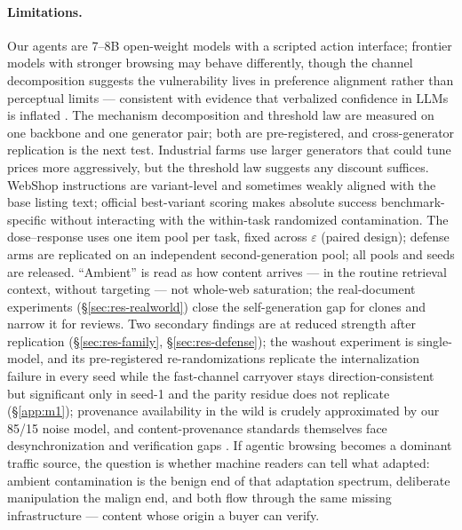 \paragraph{Limitations.}
Our agents are 7--8B open-weight models with a scripted action interface;
frontier models with stronger browsing may behave differently, though
the channel decomposition suggests the vulnerability lives in preference
alignment rather than perceptual limits --- consistent with evidence that
verbalized confidence in LLMs is inflated \cite{zhao2026wired,wang2025calibrating}. The
mechanism decomposition and threshold law are measured on one backbone
and one generator pair; both are pre-registered, and cross-generator
replication is the next test. Industrial
farms use larger generators that could tune prices more aggressively,
but the threshold law suggests any discount suffices.
WebShop instructions are variant-level and sometimes weakly aligned
with the base listing text; official best-variant scoring makes
absolute success benchmark-specific without
interacting with the within-task randomized contamination. The
dose--response uses one item pool per task, fixed across
$\varepsilon$ (paired design); defense arms are replicated on
an independent second-generation pool; all pools and seeds are
released. ``Ambient'' is read as how content arrives --- in
the routine retrieval context, without targeting --- not whole-web
saturation; the real-document experiments
(\S\ref{sec:res-realworld}) close the self-generation gap for
clones and narrow it for reviews. Two secondary
findings are at reduced strength after replication
(\S\ref{sec:res-family}, \S\ref{sec:res-defense}); the washout
experiment is single-model, and its pre-registered
re-randomizations replicate the internalization failure in every
seed while the fast-channel carryover stays direction-consistent
but significant only in seed-1 and the parity residue does not
replicate (\S\ref{app:m1}); provenance
availability in the wild is crudely approximated by our 85/15 noise
model, and content-provenance standards themselves face desynchronization
and verification gaps \cite{golaszewski2026verifying,nemecek2026authenticated}. If agentic browsing becomes
a dominant traffic source, the question is whether machine readers can
tell what adapted: ambient contamination is the benign end of
that adaptation spectrum, deliberate manipulation the malign end, and
both flow through the same missing infrastructure --- content whose
origin a buyer can verify.
